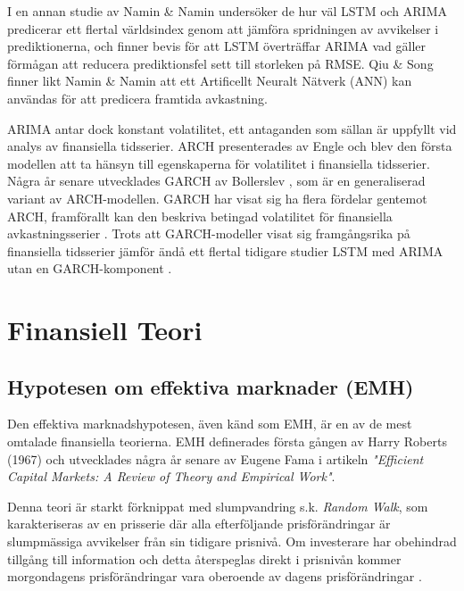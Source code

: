 \documentclass[11pt]{article}
\numberwithin{equation}{section}
\numberwithin{table}{section}
\numberwithin{figure}{section}
\begin{document}
I en annan studie av Namin \& Namin \parencite*{siaminamini2018forecasting} undersöker de hur väl LSTM och ARIMA predicerar ett flertal världsindex genom att jämföra spridningen av avvikelser i prediktionerna, och finner bevis för att LSTM överträffar ARIMA vad gäller förmågan att reducera prediktionsfel sett till storleken på RMSE. Qiu \& Song \parencite*{10.1371/journal.pone.0155133} finner likt Namin \& Namin \parencite*{siaminamini2018forecasting} att ett Artificellt Neuralt Nätverk (ANN) kan användas för att predicera framtida avkastning. 

ARIMA antar dock konstant volatilitet, ett antaganden som sällan är uppfyllt vid analys av finansiella tidsserier. ARCH presenterades av Engle \parencite*{engle1982autoregressive} och blev den första modellen att ta hänsyn till egenskaperna för volatilitet i finansiella tidsserier. Några år senare utvecklades GARCH av Bollerslev \parencite*{bollerslev1986generalized}, som är en generaliserad variant av ARCH-modellen. GARCH har visat sig ha flera fördelar gentemot ARCH, framförallt kan den beskriva betingad volatilitet för finansiella avkastningsserier \parencite[][,s.131-132]{tsay}. Trots att GARCH-modeller visat sig framgångsrika på finansiella tidsserier jämför ändå ett flertal tidigare studier LSTM med ARIMA utan en GARCH-komponent \parencite{garch}. 


\section{Finansiell Teori}

\subsection{Hypotesen om effektiva marknader (EMH)}
Den effektiva marknadshypotesen, även känd som EMH, är en av de mest omtalade finansiella teorierna. EMH definerades första gången av Harry Roberts (1967) och utvecklades några år senare av Eugene Fama \parencite*{Fama1970} i artikeln \emph{"Efficient Capital Markets: A Review of Theory and Empirical Work"}. 

Denna teori är starkt förknippat med slumpvandring s.k. \emph{Random Walk}, som karakteriseras av en prisserie där alla efterföljande prisförändringar är slumpmässiga avvikelser från sin tidigare prisnivå. Om investerare har obehindrad tillgång till information och detta återspeglas direkt i prisnivån kommer morgondagens prisförändringar vara oberoende av dagens prisförändringar \parencite{EMH}. 
\end{document}
